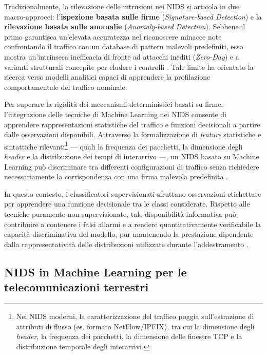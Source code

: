 Tradizionalmente, la rilevazione delle intrusioni nei NIDS si articola in due macro-approcci: l'\textbf{ispezione basata sulle firme} (\textit{Signature-based Detection}) e la \textbf{rilevazione basata sulle anomalie} (\textit{Anomaly-based Detection}).
Sebbene il primo garantisca un'elevata accuratezza nel riconoscere minacce note confrontando il traffico con un database di pattern malevoli predefiniti, esso mostra un'intrinseca inefficacia di fronte ad attacchi inediti (\textit{Zero-Day}) e a varianti strutturali concepite per eludere i controlli \cite{khraisat2019}.
Tale limite ha orientato la ricerca verso modelli analitici capaci di apprendere la profilazione comportamentale del traffico nominale. 

Per superare la rigidità dei meccanismi deterministici basati su firme, l'integrazione delle tecniche di Machine Learning nei NIDS consente di apprendere rappresentazioni statistiche del traffico e funzioni decisionali a partire dalle osservazioni disponibili.
Attraverso la formalizzazione di \textit{feature} statistiche e sintattiche rilevanti\footnote{Nei NIDS moderni, la caratterizzazione del traffico poggia sull'estrazione di attributi di flusso (es. formato NetFlow/IPFIX), tra cui la dimensione degli \textit{header}, la frequenza dei pacchetti, la dimensione delle finestre TCP e la distribuzione temporale degli interarrivi.} --- quali la frequenza dei pacchetti, la dimensione degli \textit{header} e la distribuzione dei tempi di interarrivo ---, un NIDS basato su Machine Learning può discriminare tra differenti configurazioni di traffico senza richiedere necessariamente la corrispondenza con una firma malevola predefinita \cite{hindy2020,khraisat2019}.

In questo contesto, i classificatori supervisionati sfruttano osservazioni etichettate per apprendere una funzione decisionale tra le classi considerate.
Rispetto alle tecniche puramente non supervisionate, tale disponibilità informativa può contribuire a contenere i falsi allarmi e a rendere quantitativamente verificabile la capacità discriminativa del modello, pur mantenendo la prestazione dipendente dalla rappresentatività delle distribuzioni utilizzate durante l'addestramento \cite{kilincer2021}.

\subsection{NIDS in Machine Learning per le telecomunicazioni terrestri}
\label{subsec:ids_terrestri}

